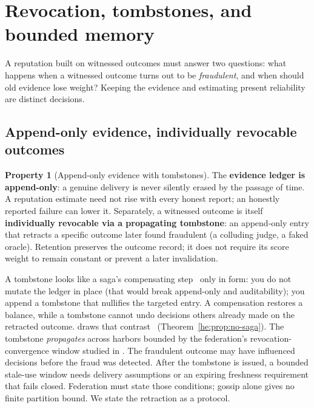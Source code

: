 \documentclass[11pt,a4paper]{article}
\theoremstyle{definition}
\newtheorem{property}{Property}[section]
\newcounter{protocol}[section]
\begin{document}
\ifdefined\pdswisslandmarkplate
\begin{figure}[p]
  \centering
\end{figure}
\pdmarginpagebreak
\fi

\section{Revocation, tombstones, and bounded memory}\label{sec:revoke}

A reputation built on witnessed outcomes must answer two questions: what
happens when a witnessed outcome turns out to be \emph{fraudulent}, and when
should old evidence lose weight? Keeping the evidence and estimating present
reliability are distinct decisions.

\subsection{Append-only evidence, individually revocable outcomes}

\begin{property}[Append-only evidence with tombstones]\label{prop:tombstone}
\setlength{\parskip}{4pt plus 1pt}
The \textbf{evidence ledger is append-only}: a genuine delivery is never
silently erased by the passage of time. A reputation estimate need not rise
with every honest report; an honestly reported failure can lower it. Separately, a witnessed
outcome is itself \textbf{individually revocable via a propagating tombstone}: an
append-only entry that retracts a specific outcome later found
fraudulent (a colluding judge, a faked oracle). Retention preserves the outcome record; it does not require its score weight
to remain constant or prevent a later invalidation.
\end{property}

\noindent A tombstone looks like a saga's compensating step~
only in form: you do not mutate the ledger in place (that would break
append-only and auditability); you append a tombstone that nullifies the
targeted entry. A compensation restores a balance, while a tombstone cannot
undo decisions others already made on the retracted outcome.
 draws that contrast%
\ifpdbook\ (Theorem~\ref{he:prop:no-saga})\fi. The tombstone
\emph{propagates} across harbors bounded by the federation's revocation-convergence
window studied in . The fraudulent outcome may have influenced decisions before the fraud was detected. After
the tombstone is issued, a bounded stale-use window needs delivery assumptions
or an expiring freshness requirement that fails closed. Federation must state
those conditions; gossip alone gives no finite partition bound. We
state the retraction as a protocol.
\end{document}
